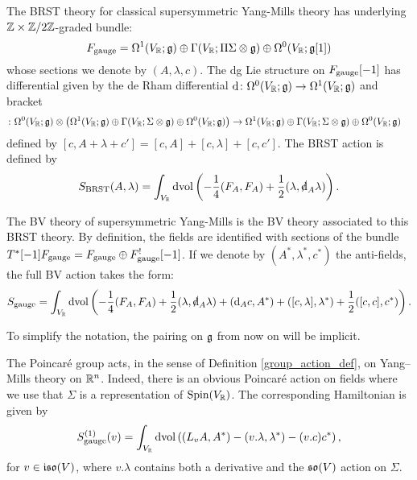 \documentclass[10pt, oneside]{article}
\newcommand{\gauge}{\mathrm{gauge}}
\begin{document}
\begin{definition}
\label{def:sym}
The BRST theory for classical supersymmetric Yang-Mills theory has underlying $\mathbb Z \times \mathbb Z/2\mathbb Z$-graded bundle:
\[
F_{\rm gauge} = \Omega^1(V_\mathbb R; \mathfrak g) \oplus \Gamma(V_\mathbb R; \Pi \Sigma \otimes \mathfrak g) \oplus \Omega^0(V_\mathbb R; \mathfrak g[1])
\]
whose sections we denote by $(A, \lambda, c)$.  
The dg Lie structure on $F_{\rm gauge}[-1]$ has differential given by the de Rham differential ${\rm d} \colon \Omega^0(V_{\mathbb R} ; \mathfrak g) \to \Omega^1(V_{\mathbb R} ; \mathfrak g)$ and bracket
\begin{align*}
[-,-]  \colon  \Omega^0(V_{\RR} ; \fg) \otimes \left(\Omega^1(V_{\RR} ; \fg) \oplus \Gamma(V_\RR ; \Sigma \otimes \fg) \oplus \Omega^0(V_{\RR} ; \fg) \right) & \to  \Omega^1(V_{\RR} ; \fg) \oplus \Gamma(V_\RR ; \Sigma \otimes \fg) \oplus \Omega^0(V_\RR ; \fg)
\end{align*}
defined by $[c, A + \lambda + c'] = [c, A] + [c, \lambda] + [c,c']$.
The BRST action is defined by
\[
S_{\mr{BRST}}(A, \lambda) = \int_{V_\RR}\dvol \left( -\frac{1}{4} (F_A, F_A) + \frac{1}{2}(\lambda, \sd \d_A \lambda)\right).
\]
\end{definition}

The BV theory of supersymmetric Yang-Mills is the BV theory associated to this BRST theory. 
By definition, the fields are identified with sections of the bundle $T^*[-1] F_{\rm gauge} = F_{\rm gauge} \oplus F_{\rm gauge}^! [-1]$. 
If we denote by $(A^*, \lambda^*,c^*)$ the anti-fields, the full BV action takes the form:
\begin{equation}
S_{\gauge} = \int_{V_\RR}\dvol \left( -\frac{1}{4} (F_A, F_A) + \frac{1}{2}(\lambda, \sd\d_A \lambda) + (\d_A c, A^*) + ([c, \lambda], \lambda^*) + \frac{1}{2}([c, c], c^*)\right).
\label{eq:YMBVaction}
\end{equation}

To simplify the notation, the pairing on $\mathfrak g$ from now on will be implicit.

The Poincar\'e group acts, in the sense of Definition \ref{group_action_def}, on Yang--Mills theory on $\mathbb R^n$. Indeed, there is an obvious Poincar\'e action on fields where we use that $\Sigma$ is a representation of $\mathrm{Spin}(V_\mathbb R)$. The corresponding Hamiltonian is given by
\begin{equation}
S_{\gauge}^{(1)}(v) = \int_{V_\RR}\dvol\left( (L_{v}A, A^*) - (v.\lambda, \lambda^*) - (v.c)c^*\right),
\label{eq:YMPoincareaction}
\end{equation}
for $v\in\mathfrak{iso}(V)$, where $v.\lambda$ contains both a derivative and the $\mathfrak{so}(V)$ action on $\Sigma$.
\end{document}
